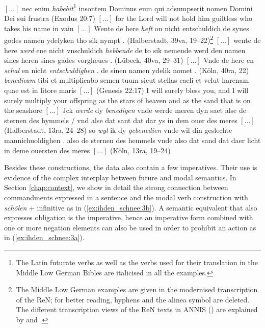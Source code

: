 \documentclass[output=paper,colorlinks,citecolor=brown]{langscibook}
\begin{document}
\ea $[\ldots]$ nec enim \textit{habebit}\footnote{The Latin futurate verbs as well as the verbs used for their translation in the Middle Low German Bibles are italicised in all the examples.}  insontem Dominus eum qui adsumpserit nomen Domini Dei sui frustra (Exodus 20:7) \label{ex:ihden_schnee:1}
\exi{} $[\ldots]$ for the Lord will not hold him guiltless who takes his name in vain
\ea $[\ldots]$ Wente de here \textit{heft} on nicht entschuldich de synes godes namen ydelyken tho sik nympt . (Halberstadt, 39va, 19--22)\footnote{The Middle Low German examples are given in the modernised transcription of the ReN; for better reading, hyphens and the alinea symbol are deleted. The different transcription views of the ReN texts in ANNIS (\cite{KrauseZeldes2016}) are explained by \citet{Barteldetal2017} and \citet[Section 6.3]{Barteldetal2021}.}\label{ex:ihden_schnee:1a}
\ex $[\ldots]$ wente de here \textit{werd} ene nicht vnschuldich \textit{hebbende} de to sik nemende werd den namen sines heren sines gades vorgheues . (Lübeck, 40va, 29--31)\label{ex:ihden_schnee:1b}
\ex $[\ldots]$ Vnde de here en \textit{schal} en nicht \textit{entschuldighen} . de sinen namen ydelik nomet . (Köln, 40ra, 22)\label{ex:ihden_schnee:1c}
\z
\z
{} %
\ea \textit{benedicam} tibi et multiplicabo semen tuum sicut stellas caeli et velut harenam quae est in litore maris $[\ldots]$ (Genesis 22:17) \label{ex:ihden_schnee:2}
\exi{} I will surely bless you, and I will surely multiply your offspring as the stars of heaven and as the sand that is on the seashore $[\ldots]$
\ea Jck \textit{werde} dy \textit{benedigen} vnde werde meren dyn saet alse de sternen des hymmels / vnd alse dat sant dat dar ys in dem ouer des meres $[\ldots]$ (Halberstadt, 13ra, 24--28)\label{ex:ihden_schnee:2a}
\ex so \textit{wyl} ik dy \textit{gebenedien} vnde wil din geslechte mannichuoldighen . also de sternen des hemmels vnde also dat sand dat daer licht in deme ouersten des meres $[\ldots]$ (Köln, 13ra, 19--24)\label{ex:ihden_schnee:2b}
\z
\z
{} %

Besides these constructions, the data also contain a few imperatives. Their use is evidence of the complex interplay between future and modal semantics. In Section \ref{chap:context}, we show in detail the strong connection between commandments expressed in a sentence and the modal verb construction with \textit{schȫlen} + infinitive as in (\ref{ex:ihden_schnee:3b}). A semantic equivalent that also expresses obligation is the imperative, hence an imperative form combined with one or more negation elements can also be used in order to prohibit an action as in (\ref{ex:ihden_schnee:3a}).
\end{document}
